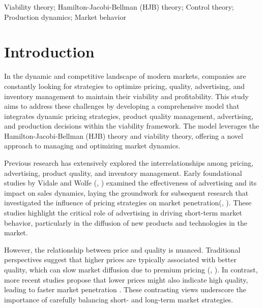 \documentclass[]{interact}
\theoremstyle{plain}%
\theoremstyle{definition}
\theoremstyle{remark}
\begin{document}
\begin{keywords}
Viability theory; Hamilton-Jacobi-Bellman (HJB) theory; Control theory; Production dynamics; Market behavior
\end{keywords}


\section{Introduction}

In the dynamic and competitive landscape of modern markets, companies are constantly looking for strategies to optimize pricing, quality, advertising, and inventory management to maintain their viability and profitability. This study aims to address these challenges by developing a comprehensive model that integrates dynamic pricing strategies, product quality management, advertising, and production decisions within the viability framework. The model leverages the Hamilton-Jacobi-Bellman (HJB) theory and viability theory, offering a novel approach to managing and optimizing market dynamics.

Previous research has extensively explored the interrelationships among pricing, advertising, product quality, and inventory management. Early foundational studies by Vidale and Wolfe (\cite{vidale1957operations}, \cite{yang2021optimal}) examined the effectiveness of advertising and its impact on sales dynamics, laying the groundwork for subsequent research that investigated the influence of pricing strategies on market penetration(\cite{robinson1975dynamic}, \cite{den2015dynamic}). These studies highlight the critical role of advertising in driving short-term market behavior, particularly in the diffusion of new products and technologies in the market.

However, the relationship between price and quality is nuanced. Traditional perspectives suggest that higher prices are typically associated with better quality, which can slow market diffusion due to premium pricing (\cite{tapiero1987reliability}, \cite{gavious2012price}). In contrast, more recent studies propose that lower prices might also indicate high quality, leading to faster market penetration \cite{heinsalu2021competitive}. These contrasting views underscore the importance of carefully balancing short- and long-term market strategies.
\end{document}

